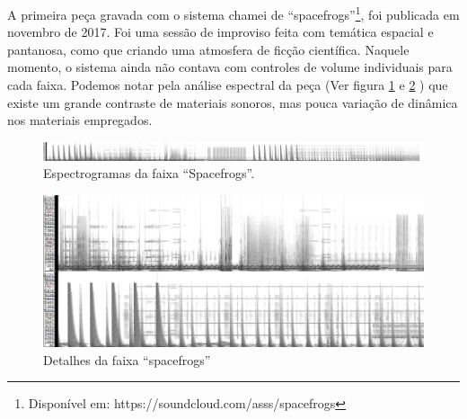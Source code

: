 A primeira peça gravada com o sistema chamei de ``spacefrogs''\footnote{Disponível em: https://soundcloud.com/asss/spacefrogs}, foi publicada em novembro de 2017. Foi uma sessão de improviso feita com temática espacial e pantanosa, como que criando uma atmosfera de ficção científica. Naquele momento, o sistema ainda não contava com controles de volume individuais para cada faixa. Podemos notar pela análise espectral da peça (Ver figura \ref{fig:spacefrogs} e \ref{fig:spacefrogsdt} ) que existe um grande contraste de materiais sonoros, mas pouca variação de dinâmica nos materiais empregados.

\begin{figure}

\includegraphics[width=1\textwidth]{pictures/cap4/spacefrogs_spectrogram}
\caption{Espectrogramas da faixa ``Spacefrogs''. }
\label{fig:spacefrogs}
\end{figure}

\begin{figure}

\includegraphics[width=1\textwidth]{pictures/cap4/spacefrogs_spectrogram_dt}
\caption{Detalhes da faixa ``spacefrogs'' }
\label{fig:spacefrogsdt}
\end{figure}







